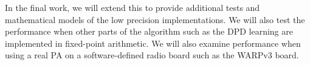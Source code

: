 \documentclass[conference]{IEEEtran}
\begin{document}
In the final work, we will extend this to provide additional tests and mathematical models of the low precision implementations. We will also test the performance when other parts of the algorithm such as the DPD learning are implemented in fixed-point arithmetic. We will also examine performance when using a real PA on a software-defined radio board such as the WARPv3 board.






%





\end{document}
